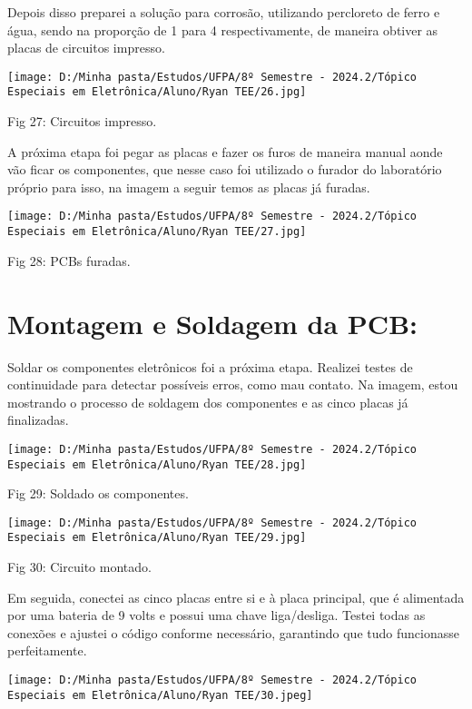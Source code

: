 \documentclass[
]{book}
\begin{document}
Depois disso preparei a solução para corrosão, utilizando percloreto de ferro e água, sendo na proporção de 1 para 4 respectivamente, de maneira obtiver as placas de circuitos impresso.

\texttt{[image: D:/Minha pasta/Estudos/UFPA/8º Semestre - 2024.2/Tópico Especiais em Eletrônica/Aluno/Ryan TEE/26.jpg]}

Fig 27: Circuitos impresso.

A próxima etapa foi pegar as placas e fazer os furos de maneira manual aonde vão ficar os componentes, que nesse caso foi utilizado o furador do laboratório próprio para isso, na imagem a seguir temos as placas já furadas.

\texttt{[image: D:/Minha pasta/Estudos/UFPA/8º Semestre - 2024.2/Tópico Especiais em Eletrônica/Aluno/Ryan TEE/27.jpg]}

Fig 28: PCBs furadas.

\section{Montagem e Soldagem da PCB:}\label{montagem-e-soldagem-da-pcb}

Soldar os componentes eletrônicos foi a próxima etapa. Realizei testes de continuidade para detectar possíveis erros, como mau contato. Na imagem, estou mostrando o processo de soldagem dos componentes e as cinco placas já finalizadas.

\texttt{[image: D:/Minha pasta/Estudos/UFPA/8º Semestre - 2024.2/Tópico Especiais em Eletrônica/Aluno/Ryan TEE/28.jpg]}

Fig 29: Soldado os componentes.

\texttt{[image: D:/Minha pasta/Estudos/UFPA/8º Semestre - 2024.2/Tópico Especiais em Eletrônica/Aluno/Ryan TEE/29.jpg]}

Fig 30: Circuito montado.

Em seguida, conectei as cinco placas entre si e à placa principal, que é alimentada por uma bateria de 9 volts e possui uma chave liga/desliga. Testei todas as conexões e ajustei o código conforme necessário, garantindo que tudo funcionasse perfeitamente.

\texttt{[image: D:/Minha pasta/Estudos/UFPA/8º Semestre - 2024.2/Tópico Especiais em Eletrônica/Aluno/Ryan TEE/30.jpeg]}
\end{document}
